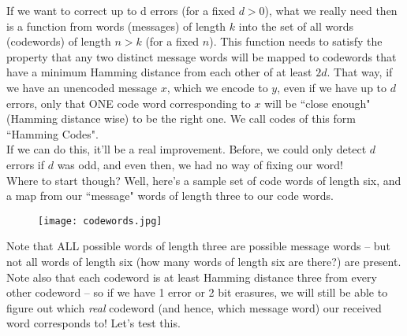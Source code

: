 If we want to correct up to d errors (for a fixed $d>0$), what we really need then is a function from words (messages) of length $k$ into the set of all words (codewords) of length $n>k$ (for a fixed $n$). This function needs to satisfy the property that any two distinct message words will be mapped to codewords that have a minimum Hamming distance from each other of at least $2d$. That way, if we have an unencoded message $x$, which we encode to $y$, even if we have up to $d$ errors, only that ONE code word corresponding to $x$ will be ``close enough" (Hamming distance wise) to be the right one. We call codes of this form ``Hamming Codes". \\

If we can do this, it'll be a real improvement. Before, we could only detect $d$ errors if $d$ was odd, and even then, we had no way of fixing our word! \\

Where to start though? Well, here's a sample set of code words of length six, and a map from our ``message" words of length three to our code words. \\

\begin{figure}[H]
   \centering
   \texttt{[image: codewords.jpg]} 
\end{figure}

Note that ALL possible words of length three are possible message words -- but not all words of length six (how many words of length six are there?) are present. Note also that each codeword is at least Hamming distance three from every other codeword -- so if we have 1 error or 2 bit erasures, we will still be able to figure out which \emph{real} codeword (and hence, which message word) our received word corresponds to! Let's test this.

 \vspace{0.2cm}

